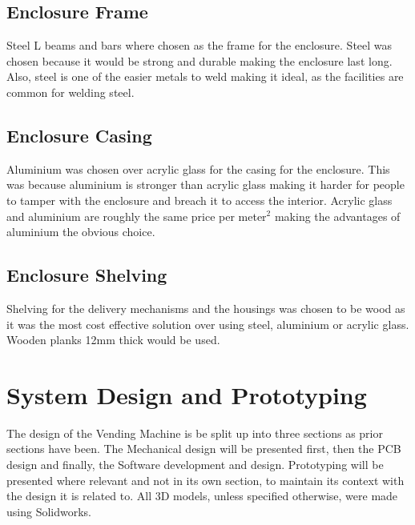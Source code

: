 \documentclass[a4paper,11pt]{article}
\numberwithin{figure}{section}
\numberwithin{table}{section}
\begin{document}
\subsection{Enclosure Frame}
Steel L beams and bars where chosen as the frame for the enclosure. Steel was chosen because it would be strong and durable making the enclosure last long. Also, steel is one of the easier metals to weld making it ideal, as the facilities are common for welding steel.

\subsection{Enclosure Casing}
Aluminium was chosen over acrylic glass for the casing for the enclosure. This was because aluminium is stronger than acrylic glass making it harder for people to tamper with the enclosure and breach it to access the interior. Acrylic glass and aluminium are roughly the same price per meter$^2$ making the advantages of aluminium the obvious choice.  

\subsection{Enclosure Shelving}
Shelving for the delivery mechanisms and the housings was chosen to be wood as it was the most cost effective solution over using steel, aluminium or acrylic glass. Wooden planks 12mm thick would be used.

\newpage
\section{System Design and Prototyping}\thispagestyle{sectionstart}
The design of the Vending Machine is be split up into three sections as prior sections have been. The Mechanical design will be presented first, then the PCB design and finally, the Software development and design. Prototyping will be presented where relevant and not in its own section, to maintain its context with the design it is related to. All 3D models, unless specified otherwise, were made using Solidworks.
\end{document}
